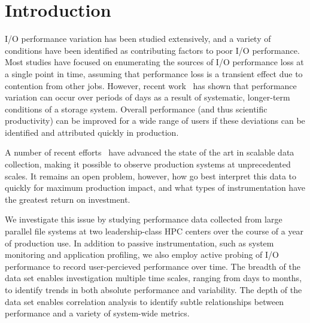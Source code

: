 \section{Introduction}

I/O performance variation has been studied extensively, and a variety of conditions have been identified as contributing factors to poor I/O performance.  Most studies have focused on enumerating the sources of I/O performance loss at a single point in time, assuming that performance loss is a transient effect due to contention from other jobs.  However, recent work~\cite{Lockwood2017} has shown that performance variation can occur over periods of days as a result of systematic, longer-term conditions of a storage system.
%
Overall performance (and thus scientific productivity) can be improved for a
wide range of users if these deviations can be identified and attributed
quickly in production.


A number of recent efforts~\cite{Lockwood2017,Vazhkudai2017guide,Agelastos2014ldms,Kunkel2014siox} have advanced the
state of the art in scalable data collection, making it possible to observe
production systems at unprecedented scales.  It remains an open problem,
however, how go best interpret this data to quickly for maximum production
impact, and what types of instrumentation have the greatest return on
investment.

We investigate this issue by studying performance data collected
from large parallel file systems at two leadership-class HPC centers
over the course of a year of production use.  In addition to passive
instrumentation, such as system monitoring and application profiling,
we also employ active probing of I/O performance to record user-percieved
performance over time.  The breadth of the data set enables investigation
multiple time scales, ranging from days to months, to identify trends in
both absolute performance and variability.  The depth of the data set
enables correlation analysis to identify subtle relationships between
performance and a variety of system-wide metrics.

